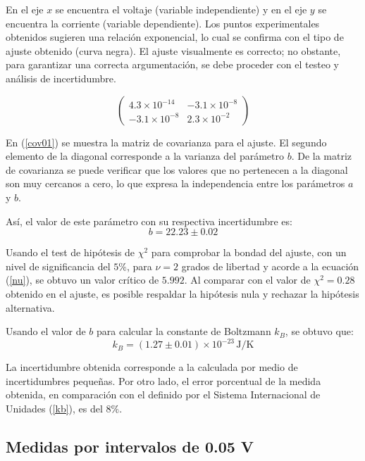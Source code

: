 \documentclass[twocolumn]{article} %
\begin{document}
En el eje $x$ se encuentra el voltaje (variable independiente) y en el eje $y$ se encuentra la corriente (variable dependiente). Los puntos experimentales obtenidos sugieren una relación exponencial, lo cual se confirma con el tipo de ajuste obtenido (curva negra). El ajuste visualmente es correcto; no obstante, para garantizar una correcta argumentación, se debe proceder con el testeo y análisis de incertidumbre.

\begin{equation}
    \begin{pmatrix}
4.3\times10^{-14} & -3.1\times10^{-8} \\
-3.1\times10^{-8} & 2.3\times10^{-2}
\end{pmatrix}
\label{cov01}
\end{equation}

En (\ref{cov01}) se muestra la matriz de covarianza para el ajuste. El segundo elemento de la diagonal corresponde a la varianza del parámetro $b$. De la matriz de covarianza se puede verificar que los valores que no pertenecen a la diagonal son muy cercanos a cero, lo que expresa la independencia entre los parámetros $a$ y $b$.

Así, el valor de este parámetro con su respectiva incertidumbre es:
\begin{equation*}
 b = 22.23 \pm 0.02
\end{equation*}

Usando el test de hipótesis de $\chi^2$ para comprobar la bondad del ajuste, con un nivel de significancia del $5\%$, para $\nu = 2$ grados de libertad y acorde a la ecuación (\ref{nu}), se obtuvo un valor crítico de $5.992$. Al comparar con el valor de $\chi^2 = 0.28$ obtenido en el ajuste, es posible respaldar la hipótesis nula y rechazar la hipótesis alternativa.

Usando el valor de $b$ para calcular la constante de Boltzmann $k_B$, se obtuvo que:
\begin{equation*}
k_B = (1.27 \pm 0.01) \times 10^{-23} \, \text{J/K}
\end{equation*}

La incertidumbre obtenida corresponde a la calculada por medio de incertidumbres pequeñas. Por otro lado, el error porcentual de la medida obtenida, en comparación con el definido por el Sistema Internacional de Unidades (\ref{kb}), es del $8\%$.

\subsection{Medidas por intervalos de 0.05 V}
\end{document}
